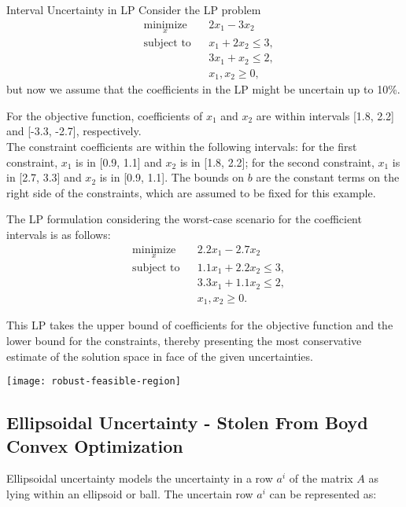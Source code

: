 \begin{example}{Interval Uncertainty in LP}{}
Consider the LP problem
\begin{equation}
\begin{aligned}
& \underset{x}{\text{minimize}}
& & 2x_1 - 3x_2 \\
& \text{subject to}
& & x_1 + 2x_2 \leq 3, \\
&&& 3x_1 + x_2 \leq 2, \\
&&& x_1, x_2 \geq 0,
\end{aligned}
\end{equation}
but now we assume that the coefficients in the LP might be uncertain up to 10\%.  

For the objective function, coefficients of \( x_1 \) and \( x_2 \) are within intervals [1.8, 2.2] and [-3.3, -2.7], respectively.\\
 The constraint coefficients are within the following intervals: for the first constraint, \( x_1 \) is in [0.9, 1.1] and \( x_2 \) is in [1.8, 2.2]; for the second constraint, \( x_1 \) is in [2.7, 3.3] and \( x_2 \) is in [0.9, 1.1]. The bounds on \( b \) are the constant terms on the right side of the constraints, which are assumed to be fixed for this example.

The LP formulation considering the worst-case scenario for the coefficient intervals is as follows:
\begin{equation}
\begin{aligned}
& \underset{x}{\text{minimize}}
& & 2.2x_1 - 2.7x_2 \\
& \text{subject to}
& & 1.1x_1 + 2.2x_2 \leq 3, \\
&&& 3.3x_1 + 1.1x_2 \leq 2, \\
&&& x_1, x_2 \geq 0.
\end{aligned}
\end{equation}

This LP takes the upper bound of coefficients for the objective function and the lower bound for the constraints, thereby presenting the most conservative estimate of the solution space in face of the given uncertainties.

\begin{center}
\texttt{[image: robust-feasible-region]}
\end{center}
\end{example}

\subsection{Ellipsoidal Uncertainty - Stolen From Boyd Convex Optimization}
Ellipsoidal uncertainty models the uncertainty in a row \(a^i\) of the matrix \(A\) as lying within an ellipsoid or ball. The uncertain row \(a^i\) can be represented as:

